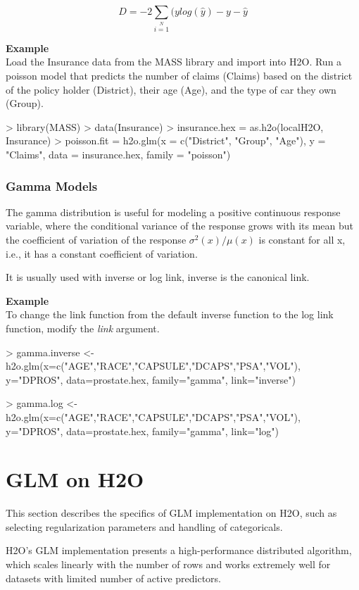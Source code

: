 \documentclass[11pt]{article}
\begin{document}
\[D = -2\sum\limits_{i=1}\limits^{N}{(y log(\hat{y}) - y - \hat{y}}\]


\textbf{Example}\\
Load the Insurance data from the MASS library and import into H2O. Run a poisson model that predicts the number of claims (Claims) based on the district of the policy holder (District), their age (Age), and the type of car they own (Group).
\begin{spverbatim}
> library(MASS)
> data(Insurance)
> insurance.hex = as.h2o(localH2O, Insurance)
> poisson.fit = h2o.glm(x = c("District", "Group", "Age"), y = "Claims", 
data = insurance.hex, family = "poisson")
\end{spverbatim}

\subsubsection{Gamma Models}
The gamma distribution is useful for modeling a positive continuous response variable, where the conditional variance of the response grows with its mean but  the coefficient of variation of the response $\sigma^2(x)/μ(x)$ is constant for all x,  i.e., it has a constant coefficient of variation.

It is usually used with inverse or log link, inverse is the canonical link.

\textbf{Example}\\
To change the link function from the default inverse function to the log link function, modify the \textit{link} argument.

\begin{spverbatim}
> gamma.inverse <- h2o.glm(x=c("AGE","RACE","CAPSULE","DCAPS","PSA","VOL"), y="DPROS", data=prostate.hex, family="gamma", link="inverse")

> gamma.log <- h2o.glm(x=c("AGE","RACE","CAPSULE","DCAPS","PSA","VOL"), y="DPROS", data=prostate.hex, family="gamma", link="log")
\end{spverbatim}



\section{GLM on H2O}
This section describes the specifics of GLM implementation on H2O, such as selecting regularization parameters and handling of categoricals. 

H2O's GLM implementation presents a high-performance distributed algorithm, which scales linearly with the number of rows and works extremely well for datasets with limited number of active predictors. 
\end{document}
